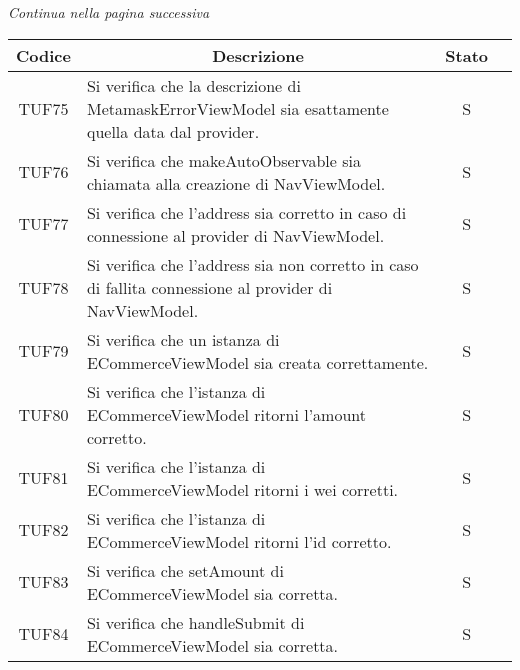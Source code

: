 \begin{center}
  \textit{\small Continua nella pagina successiva}
\end{center}
\begin{table}[H]
  \centering
  \renewcommand{\arraystretch}{1.8}
  \begin{tabular}{c|p{8cm}|c|c}
    \rowcolor[HTML]{125E28}
    \color[HTML]{FFFFFF}\textbf{Codice}
          & \multicolumn{1}{c}{\color[HTML]{FFFFFF}\textbf{Descrizione}}
          & \color[HTML]{FFFFFF}\textbf{Stato}                                                                                                          \\
    \hline
    TUF75 & Si verifica che la descrizione di MetamaskErrorViewModel sia esattamente quella data dal provider.                                      & S \\
    TUF76 & Si verifica che makeAutoObservable sia chiamata alla creazione di NavViewModel.                                                         & S \\
    TUF77 & Si verifica che l'address sia corretto in caso di connessione al provider di NavViewModel.                                              & S \\
    TUF78 & Si verifica che l'address sia non corretto in caso di fallita connessione al provider di NavViewModel.                                  & S \\
    TUF79 & Si verifica che un istanza di ECommerceViewModel sia creata correttamente.                                                              & S \\
    TUF80 & Si verifica che l'istanza di ECommerceViewModel ritorni l'amount corretto.                                                              & S \\
    TUF81 & Si verifica che l'istanza di ECommerceViewModel ritorni i wei corretti.                                                                 & S \\
    TUF82 & Si verifica che l'istanza di ECommerceViewModel ritorni l'id corretto.                                                                  & S \\
    TUF83 & Si verifica che setAmount di ECommerceViewModel sia corretta.                                                                           & S \\
    TUF84 & Si verifica che handleSubmit di ECommerceViewModel sia corretta.                                                                        & S \\

\end{tabular}
\end{table}
